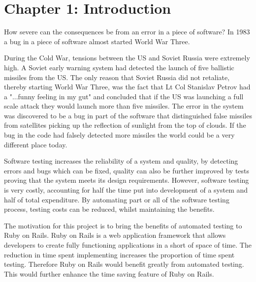 \documentclass[a4paper,12pt]{article}
\begin{document}
\newpage
\tableofcontents
\listoffigures
 
\listoftables
\lstlistoflistings
\newpage	
{}
\section{Chapter 1: Introduction}

\par How severe can the consequences be from an error in a piece of software? In 1983 a bug in a piece of software almost started World War Three.
\vspace{3mm}
\par During the Cold War, tensions between the US and Soviet Russia were extremely high. A Soviet early warning system had detected the launch of five ballistic missiles from the US. The only reason that Soviet Russia did not retaliate, thereby starting World War Three, was the fact that Lt Col Stanislav Petrov had a "...funny feeling in my gut"\cite{ZDNetDisasters} and concluded that if the US was launching a full scale attack they would launch more than five missiles. The error in the system was discovered to be a bug in part of the software that distinguished false missiles from satellites picking up the reflection of sunlight from the top of clouds.\cite{ZDNetDisasters} If the bug in the code had falsely detected more missiles the world could be a very different place today.
\vspace{3mm}
\par Software testing increases the reliability of a system and quality, by detecting errors and bugs which can be fixed, quality can also be further improved by tests proving that the system meets its design requirements. However, software testing is very costly, accounting for half the time put into development of a system and half of total expenditure.\cite{myers2011art} By automating part or all of the software testing process, testing costs can be reduced, whilst maintaining the benefits.
\vspace{3mm}
\par The motivation for this project is to bring the benefits of automated testing to Ruby on Rails. Ruby on Rails is a web application framework that allows developers to create fully functioning applications in a short of space of time. The reduction in time spent implementing increases the proportion of time spent testing. Therefore Ruby on Rails would benefit greatly from automated testing. This would further enhance the time saving feature of Ruby on Rails.
\end{document}
